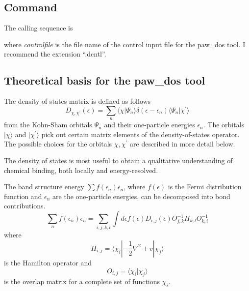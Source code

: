 \documentclass[final,12pt]{article}
\begin{document}
{{{{{{%
\subsection{Command}

The calling sequence is

\bigskip{}\bigskip

\noindent
where {\it controlfile} is the file name of the control input file for
the paw\_dos tool. I recommend the extension ``.dcntl''.


\subsection{Theoretical basis for the paw\_dos tool}

The density of states matrix is defined as follows
\begin{equation}
  D_{\chi,\chi^\prime}(\epsilon)
 =\sum_n
  \langle\chi|\Psi_n\rangle
\delta(\epsilon-\epsilon_n)
\langle\Psi_n|\chi^\prime\rangle
\end{equation}
from the Kohn-Sham orbitals $\Psi_n$ and their one-particle energies
$\epsilon_n$. The orbitals $|\chi\rangle$ and $|\chi^\prime\rangle$
pick out certain matrix elements of the density-of-states
operator. The possible choices for the orbitals $\chi,\chi^\prime$ are
described in more detail below.

The density of states is most useful to obtain a qualitative
understanding of chemical binding, both locally and energy-resolved.

The band structure energy $\sum f(\epsilon_n)\epsilon_n$, where
$f(\epsilon)$ is the Fermi distribution function and $\epsilon_n$ are
the one-particle energies, can be decomposed into bond
contributions. 
\begin{equation}
\sum_n f(\epsilon_n)\epsilon_n 
= \sum_{i,j,k,l} \int d\epsilon f(\epsilon)
D_{i,j}(\epsilon) O^{-1}_{j,k} H_{k,l}O^{-1}_{k,i}
\label{eq:dosebandeq1}
\end{equation}
where 
\begin{equation}
H_{i,j}=\langle\chi_i|-\frac{1}{2}\nabla^2+v|\chi_j\rangle
\end{equation}
is the Hamilton operator and 
\begin{equation}
O_{i,j}=\langle\chi_i|\chi_j\rangle
\end{equation}
is the overlap matrix for a complete set of functions $\chi_i$.

}}}}}}
\end{document}
